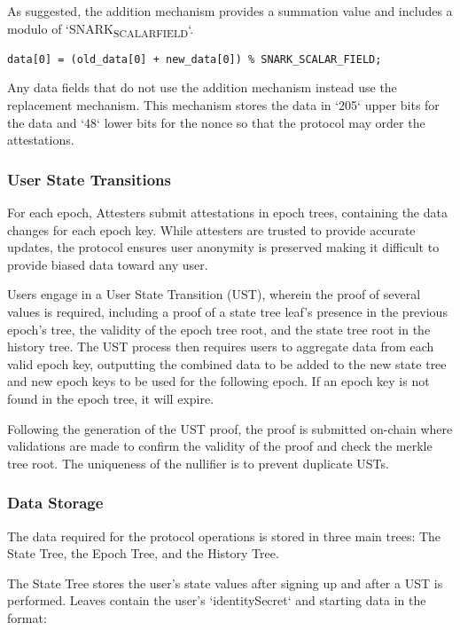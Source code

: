 \documentclass[11pt]{article}
\begin{document}
As suggested, the addition mechanism provides a summation value and includes a modulo of `SNARK\textsubscript{SCALAR}\textsubscript{FIELD}`.

\begin{verbatim}
data[0] = (old_data[0] + new_data[0]) % SNARK_SCALAR_FIELD;
\end{verbatim}

Any data fields that do not use the addition mechanism instead use the replacement mechanism. This mechanism stores the data in `205` upper bits for the data and `48` lower bits for the nonce so that the protocol may order the attestations.
\subsubsection{User State Transitions}
\label{sec:orgf01cbeb}

For each epoch, Attesters submit attestations in epoch trees, containing the data changes for each epoch key. While attesters are trusted to provide accurate updates, the protocol ensures user anonymity is preserved making it difficult to provide biased data toward any user.

Users engage in a User State Transition (UST), wherein the proof of several values is required, including a proof of a state tree leaf's presence in the previous epoch's tree, the validity of the epoch tree root, and the state tree root in the history tree. The UST process then requires users to aggregate data from each valid epoch key, outputting the combined data to be added to the new state tree and new epoch keys to be used for the following epoch. If an epoch key is not found in the epoch tree, it will expire.

Following the generation of the UST proof, the proof is submitted on-chain where validations are made to confirm the validity of the proof and check the merkle tree root. The uniqueness of the nullifier is to prevent duplicate USTs.
\subsubsection{Data Storage}
\label{sec:orge713ac7}

The data required for the protocol operations is stored in three main trees: The State Tree, the Epoch Tree, and the History Tree.

The State Tree stores the user's state values after signing up and after a UST is performed. Leaves contain the user's `identitySecret` and starting data in the format:
\end{document}
